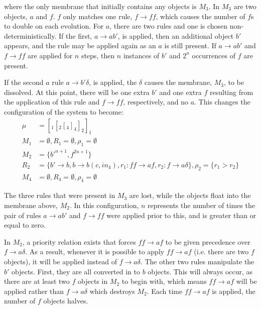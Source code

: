 \noindent where the only membrane that initially contains any objects is
$M_3$.  In $M_3$ are two objects, $a$ and $f$.  $f$ only matches one
rule, $f \rightarrow ff$, which causes the number of $f$s to double on
each evolution.  For $a$, there are two rules and one is chosen
non-deterministically.  If the first, $a \rightarrow ab'$, is applied,
then an additional object $b'$ appears, and the rule may be applied
again as an $a$ is still present.  If $a \rightarrow ab'$ and $f
\rightarrow ff$ are applied for $n$ steps, then $n$ instances of $b'$
and $2^n$ occurrences of $f$ are present.

If the second $a$ rule $a \rightarrow b'\delta$, is applied, the
$\delta$ causes the membrane, $M_3$, to be dissolved.  At this point,
there will be one extra $b'$ and one extra $f$ resulting from the
application of this rule and $f \rightarrow ff$, respectively, and no
$a$.  This changes the configuration of the system to become:
\begin{align*}
\mu & = [_1[_2[_4]_4]_2]_1 \\
M_1 & = \emptyset, 
R_1 = \emptyset,
\rho_1 = \emptyset \\
M_2 & = \{b'^{n+1}, f^{2n+1}\} \\ 
R_2 & = \{b' \rightarrow b, b \rightarrow b(c, in_4), r_1 : ff
 \rightarrow af, r_2 : f \rightarrow a\delta\},
\rho_2 = \{r_1 > r_2\} \\
M_4 & = \emptyset,
R_4 = \emptyset,
\rho_4 = \emptyset
\end{align*}

\noindent The three rules that were present in $M_3$ are lost, while the
objects float into the membrane above, $M_2$.  In this configuration,
$n$ represents the number of times the pair of rules $a \rightarrow ab'$
and $f \rightarrow ff$ were applied prior to this, and is greater than
or equal to zero.

In $M_2$, a priority relation exists that forces $ff \rightarrow af$ to
be given precedence over $f \rightarrow a\delta$.  As a result, whenever
it is possible to apply $ff \rightarrow af$ (i.e. there are two $f$
objects), it will be applied instead of $f \rightarrow a\delta$.  The
other two rules manipulate the $b'$ objects. First, they are all
converted in to $b$ objects.  This will always occur, as there are at
least two $f$ objects in $M_2$ to begin with, which means $ff
\rightarrow af$ will be applied rather than $f \rightarrow a\delta$
which destroys $M_2$.  Each time $ff \rightarrow af$ is applied, the
number of $f$ objects halves.

